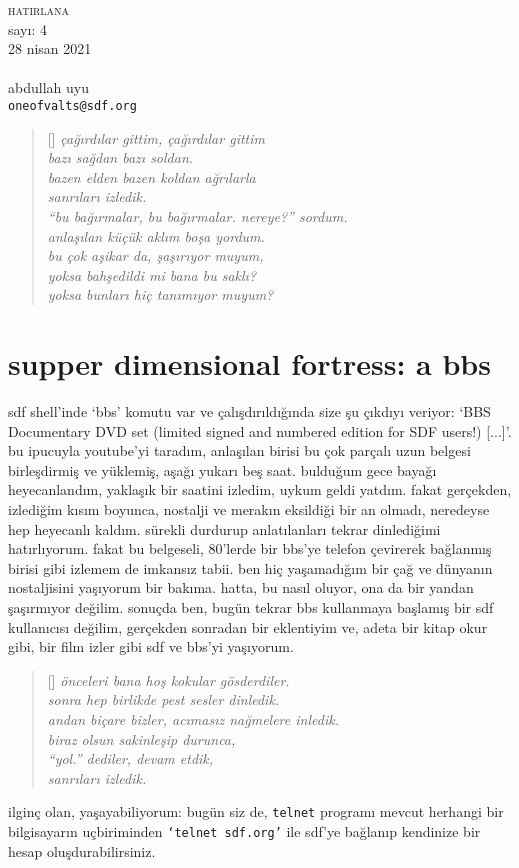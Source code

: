\documentclass[a4paper, twocolumn, openright]{memoir}
\begin{document}
\thispagestyle{plain}
\noindent
{\HUGE\textsc{hatirlana}\\\small{}sayı: 4\\28 nisan 2021}\\\\
{\small{}abdullah uyu\\\texttt{oneofvalts@sdf.org}}
\bigskip
{}
\begin{verse}[\versewidth]
\itshape{}
çağırdılar gittim, çağırdılar gittim\\
bazı sağdan bazı soldan.\\
bazen elden bazen koldan ağrılarla\\
sanrıları izledik.\\
``bu bağırmalar, bu bağırmalar. nereye?'' sordum.\\
anlaşılan küçük aklım boşa yordum.\\
bu çok aşikar da, şaşırıyor muyum,\\
yoksa bahşedildi mi bana bu saklı?\\
yoksa bunları hiç tanımıyor muyum?\\
\end{verse}
\section{supper dimensional fortress: a bbs}
sdf shell'inde {\ttfamily `bbs'} komutu var ve çalışdırıldığında size şu
çıkdıyı veriyor: {\ttfamily `BBS  Documentary   DVD  set  (limited signed
and  numbered edition  for SDF users!) [...]'}. bu ipucuyla youtube'yi
taradım, anlaşılan birisi bu çok parçalı uzun belgesi birleşdirmiş ve
yüklemiş, aşağı yukarı beş saat. bulduğum gece bayağı heyecanlandım,
yaklaşık bir saatini izledim, uykum geldi yatdım. fakat gerçekden,
izlediğim kısım boyunca, nostalji ve merakın eksildiği bir an olmadı,
neredeyse hep heyecanlı kaldım. sürekli durdurup anlatılanları tekrar
dinlediğimi hatırlıyorum. fakat bu belgeseli, 80'lerde bir bbs'ye telefon
çevirerek bağlanmış birisi gibi izlemem de imkansız tabii. ben hiç
yaşamadığım bir çağ ve dünyanın nostaljisini yaşıyorum bir bakıma.
hatta, bu nasıl oluyor, ona da bir yandan şaşırmıyor değilim. sonuçda
ben, bugün tekrar bbs kullanmaya başlamış bir sdf kullanıcısı değilim,
gerçekden sonradan bir eklentiyim ve, adeta bir kitap okur gibi, bir film
izler gibi sdf ve bbs'yi yaşıyorum.
\begin{verse}[\versewidth]
\itshape{}
önceleri bana hoş kokular gösderdiler.\\
sonra hep birlikde pest sesler dinledik.\\
andan biçare bizler, acımasız nağmelere inledik.\\
biraz olsun sakinleşip durunca,\\
``yol.'' dediler, devam etdik,\\
sanrıları izledik.\\
\end{verse}
ilginç olan, yaşayabiliyorum: bugün
siz de, \texttt{telnet} programı mevcut herhangi bir bilgisayarın
uçbiriminden \texttt{`telnet sdf.org'} ile sdf'ye bağlanıp kendinize bir
hesap oluşdurabilirsiniz.
\end{document}
